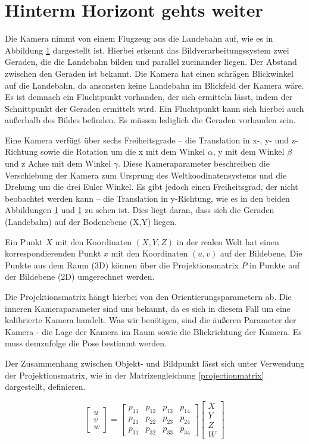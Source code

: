\documentclass{ezb}
\begin{document}
\section{Hinterm Horizont gehts weiter}
Die Kamera nimmt von einem Flugzeug aus die Landebahn auf, wie es in Abbildung \ref{} dargestellt ist. Hierbei erkennt das Bildverarbeitungssystem zwei Geraden, die die Landebahn bilden und parallel zueinander liegen. Der Abstand zwischen den Geraden ist bekannt. Die Kamera hat einen schrägen Blickwinkel auf die Landebahn, da ansonsten keine Landebahn im Blickfeld der Kamera wäre. Es ist demnach ein Fluchtpunkt vorhanden, der sich ermitteln lässt, indem der Schnittpunkt der Geraden ermittelt wird. Ein Fluchtpunkt kann sich hierbei auch außerhalb des Bildes befinden. Es müssen lediglich die Geraden vorhanden sein.

Eine Kamera verfügt über sechs Freiheitsgrade – die Translation in x-, y- und z-Richtung sowie die Rotation um die x mit dem Winkel $\alpha$, y mit dem Winkel $\beta$ und z Achse mit dem Winkel $\gamma$. Diese Kameraparameter beschreiben die Verschiebung  der Kamera zum Ursprung des Weltkoodinatensystems und die Drehung um die drei Euler Winkel. Es gibt jedoch einen Freiheitsgrad, der nicht beobachtet werden kann – die Translation in y-Richtung, wie es in den beiden Abbildungen \ref{} und \ref{} zu sehen ist. Dies liegt daran, dass sich die Geraden (Landebahn) auf der Bodenebene (X,Y) liegen.

Ein Punkt $X$ mit den Koordinaten $(X,Y,Z)$ in der realen Welt hat einen korrespondierenden Punkt $x$ mit den Koordinaten $(u,v)$ auf der Bildebene. Die Punkte aus dem Raum (3D) können über die Projektionsmatrix $P$ in Punkte auf der Bildebene (2D) umgerechnet werden.

Die Projektionsmatrix hängt hierbei von den Orientierungsparametern ab. Die inneren Kameraparameter sind uns bekannt, da es sich in diesem Fall um eine kalibrierte Kamera handelt. Was wir benötigen, sind die äußeren Parameter der Kamera - die Lage der Kamera im Raum sowie die Blickrichtung der Kamera. Es muss demzufolge die Pose bestimmt werden.

Der Zusammenhang zwischen Objekt- und Bildpunkt lässt sich unter Verwendung der Projektionsmatrix, wie in der Matrizengleichung \ref{projectionmatrix} dargestellt, definieren.

\begin{equation} \label{projectionmatrix}
\begin{bmatrix}
u \\
v \\
w 
\end{bmatrix}
=
\begin{bmatrix}
p_{11} & p_{12} & p_{13} & p_{14} \\
p_{21} & p_{22} & p_{23} & p_{24} \\
p_{31} & p_{32} & p_{33} & p_{34} 
\end{bmatrix}
\begin{bmatrix}
X \\
Y \\
Z \\
W
\end{bmatrix}
\end{equation}  
\end{document}
